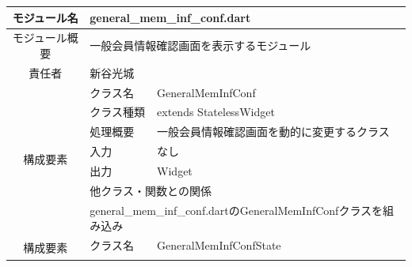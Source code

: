 \begin{table}[H]
  \centering
  \begin{tabular}{|c|l|l|} \hline
    モジュール名                & \multicolumn{2}{l|}{general\_mem\_inf\_conf.dart}                                                                                    \\ \hline
    モジュール概要               & \multicolumn{2}{p{12cm}|}{一般会員情報確認画面を表示するモジュール}                                                                                      \\ \hline
    責任者                   & \multicolumn{2}{l|}{新谷光城}                                                                                                            \\ \hline
    \multirow{7}{*}{構成要素} & クラス名                                                                              & GeneralMemInfConf                                \\ \cline{2-3}
                          & クラス種類                                                                             & extends StatelessWidget                          \\ \cline{2-3}
                          & 処理概要                                                                              & \multicolumn{1}{p{12cm}|}{一般会員情報確認画面を動的に変更するクラス} \\ \cline{2-3}
                          & 入力                                                                                & なし                                               \\ \cline{2-3}
                          & 出力                                                                                & Widget                                           \\ \cline{2-3}
                          & \multicolumn{2}{l|}{他クラス・関数との関係}                                                                                                     \\ \cline{2-3}
                          & \multicolumn{2}{p{14cm}|}{general\_mem\_inf\_conf.dartのGeneralMemInfConfクラスを組み込み}                                                    \\ \hline
    \multirow{7}{*}{構成要素} & クラス名                                                                              & GeneralMemInfConfState                           \\ \cline{2-3}

\end{tabular}
\end{table}
